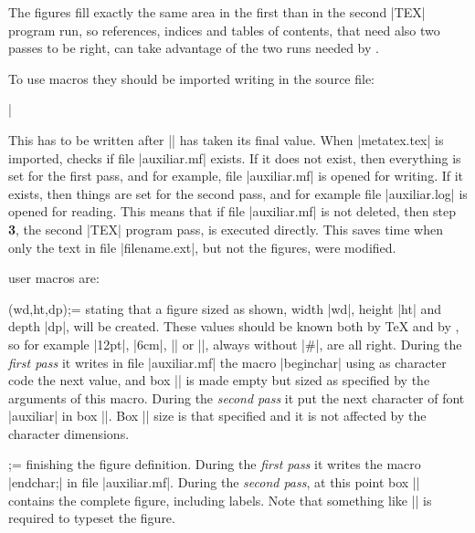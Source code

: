The figures fill exactly the same area in the first than in the
second |TEX| program run, so references, indices and tables of
contents, that need also two passes to be right, can take advantage
of the two runs needed by {\MTeX}.

\bigskip

To use {\MTeX} macros they should be imported writing in the
source file:

\indent|

This has to be written after |\mag| has taken its final value.  When
|metatex.tex| is imported, {\MTeX} checks if file |auxiliar.mf|
exists.  If it does not exist, then everything is set for the first
pass, and for example, file |auxiliar.mf| is opened for writing.  If
it exists, then things are set for the second pass, and for example
file |auxiliar.log| is opened for reading.  This means that if file
|auxiliar.mf| is not deleted, then step {\bf 3}, the second |TEX|
program pass, is executed directly.  This saves time when only the
text in file |filename.ext|, but not the figures, were modified.

{\MTeX} user macros are:

\macro\MTbeginchar(wd,ht,dp);= stating that a figure sized as shown,
width |wd|, height |ht| and depth |dp|, will be created.  These
values should be known both by {\TeX} and by {\MF}, so for example
|12pt|, |6cm|, |\the\hsize| or |\the{}|, always without |#|,
are all right.  During the {\it first pass\/} it writes in file
|auxiliar.mf| the {\MF} macro |beginchar| using as character code
the next value, and box |\MTbox| is made empty but sized
as specified by the arguments of this macro.  During the {\it second
pass\/} it put the next character of font |auxiliar| in
box |\MTbox|.  Box |\MTbox| size is that specified and it is not
affected by the character dimensions.

\macro\MTendchar;= finishing the figure definition.  During the {\it first
pass\/} it writes the {\MF} macro |endchar;| in file |auxiliar.mf|.  During
the {\it second pass}, at this point box |\MTbox| contains the complete
figure, including labels.  Note that something like |\box\MTbox| is
required to typeset the figure.

